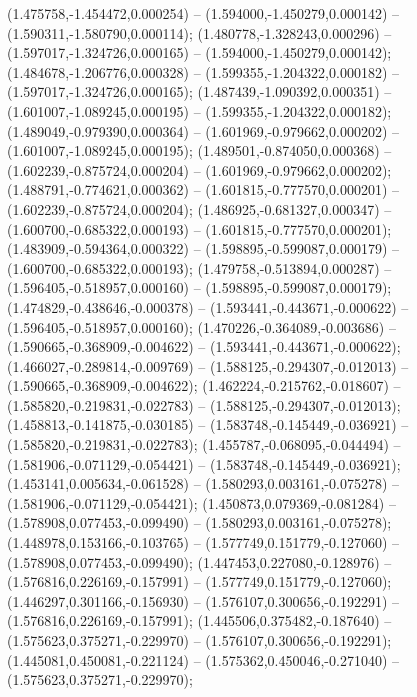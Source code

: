  (1.475758,-1.454472,0.000254) -- (1.594000,-1.450279,0.000142) -- (1.590311,-1.580790,0.000114);
 (1.480778,-1.328243,0.000296) -- (1.597017,-1.324726,0.000165) -- (1.594000,-1.450279,0.000142);
 (1.484678,-1.206776,0.000328) -- (1.599355,-1.204322,0.000182) -- (1.597017,-1.324726,0.000165);
 (1.487439,-1.090392,0.000351) -- (1.601007,-1.089245,0.000195) -- (1.599355,-1.204322,0.000182);
 (1.489049,-0.979390,0.000364) -- (1.601969,-0.979662,0.000202) -- (1.601007,-1.089245,0.000195);
 (1.489501,-0.874050,0.000368) -- (1.602239,-0.875724,0.000204) -- (1.601969,-0.979662,0.000202);
 (1.488791,-0.774621,0.000362) -- (1.601815,-0.777570,0.000201) -- (1.602239,-0.875724,0.000204);
 (1.486925,-0.681327,0.000347) -- (1.600700,-0.685322,0.000193) -- (1.601815,-0.777570,0.000201);
 (1.483909,-0.594364,0.000322) -- (1.598895,-0.599087,0.000179) -- (1.600700,-0.685322,0.000193);
 (1.479758,-0.513894,0.000287) -- (1.596405,-0.518957,0.000160) -- (1.598895,-0.599087,0.000179);
 (1.474829,-0.438646,-0.000378) -- (1.593441,-0.443671,-0.000622) -- (1.596405,-0.518957,0.000160);
 (1.470226,-0.364089,-0.003686) -- (1.590665,-0.368909,-0.004622) -- (1.593441,-0.443671,-0.000622);
 (1.466027,-0.289814,-0.009769) -- (1.588125,-0.294307,-0.012013) -- (1.590665,-0.368909,-0.004622);
 (1.462224,-0.215762,-0.018607) -- (1.585820,-0.219831,-0.022783) -- (1.588125,-0.294307,-0.012013);
 (1.458813,-0.141875,-0.030185) -- (1.583748,-0.145449,-0.036921) -- (1.585820,-0.219831,-0.022783);
 (1.455787,-0.068095,-0.044494) -- (1.581906,-0.071129,-0.054421) -- (1.583748,-0.145449,-0.036921);
 (1.453141,0.005634,-0.061528) -- (1.580293,0.003161,-0.075278) -- (1.581906,-0.071129,-0.054421);
 (1.450873,0.079369,-0.081284) -- (1.578908,0.077453,-0.099490) -- (1.580293,0.003161,-0.075278);
 (1.448978,0.153166,-0.103765) -- (1.577749,0.151779,-0.127060) -- (1.578908,0.077453,-0.099490);
 (1.447453,0.227080,-0.128976) -- (1.576816,0.226169,-0.157991) -- (1.577749,0.151779,-0.127060);
 (1.446297,0.301166,-0.156930) -- (1.576107,0.300656,-0.192291) -- (1.576816,0.226169,-0.157991);
 (1.445506,0.375482,-0.187640) -- (1.575623,0.375271,-0.229970) -- (1.576107,0.300656,-0.192291);
 (1.445081,0.450081,-0.221124) -- (1.575362,0.450046,-0.271040) -- (1.575623,0.375271,-0.229970);

